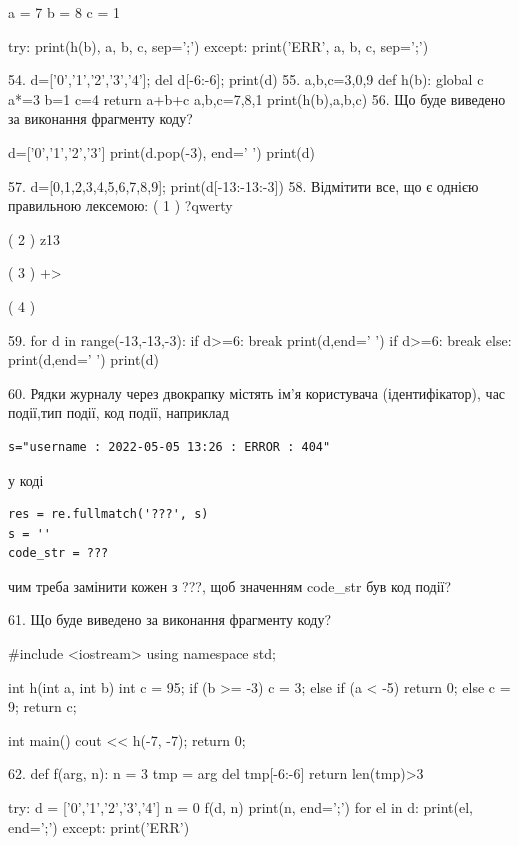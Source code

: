 \documentclass[11pt]{article}
\begin{document}
{a = 7
b = 8
c = 1

try:
    print(h(b), a, b, c, sep=';')
except:
    print('ERR', a, b, c, sep=';')

54. 
d=['0','1','2','3','4']; del d[-6:-6]; print(d)
55. 
a,b,c=3,0,9
    def h(b):
      global c      a*=3
      b=1
      c=4
      return a+b+c
    a,b,c=7,8,1
    print(h(b),a,b,c)
56. Що буде виведено за виконання фрагменту коду?

d=['0','1','2','3']
print(d.pop(-3), end=' ')
print(d)


57. 
d=[0,1,2,3,4,5,6,7,8,9]; print(d[-13:-13:-3])
58. %
Відмітити все, що є однією правильною лексемою:
( 1 ) ?qwerty

( 2 ) z13

( 3 ) +>

( 4 ) %

59. 
for d in range(-13,-13,-3):
    if d>=6:
        break
        print(d,end=' ')
    if d>=6:
        break
    else:
        print(d,end=' ')
    print(d)

60. 
Рядки журналу через двокрапку містять ім'я користувача (ідентифікатор), час події,тип події, код події, наприклад
\begin{verbatim}
s="username : 2022-05-05 13:26 : ERROR : 404"
\end{verbatim}
у коді 
\begin{verbatim}
res = re.fullmatch('???', s) 
s = ''
code_str = ??? 
\end{verbatim}
чим треба замінити кожен з ???, щоб значенням code\_str був код події? 



61. Що буде виведено за виконання фрагменту коду?

#include <iostream>
using namespace std;

int h(int a, int b){
    int c = 95;
    if (b >= -3)
        c = 3;
    else if (a < -5)
         return 0;
    else 
        c = 9;
    return c;
}

int main(){
    cout << h(-7, -7);
    return 0;
}

62. 
def f(arg, n):
    n = 3
    tmp = arg
    del tmp[-6:-6]
    return len(tmp)>3

try:
    d = ['0','1','2','3','4']
    n = 0
    f(d, n)
    print(n, end=';')
    for el in d:
        print(el, end=';')
except:
    print('ERR')

}
\end{document}
